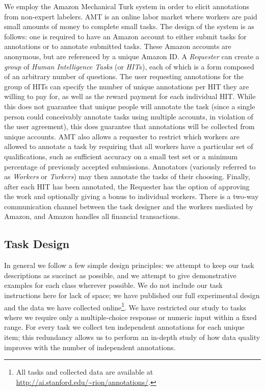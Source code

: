 \documentclass[11pt]{article}
\newcommand{\hurl}[1]{\href{#1}{\scriptsize{\url{#1}}}}
\begin{document}
We employ the Amazon Mechanical Turk system in order to elicit annotations from non-expert labelers.  %
AMT is an online labor market where workers are paid small amounts of money to complete small tasks.  The design of the system is as follows: one is required to have an Amazon account to either submit tasks for annotations or to annotate submitted tasks.  These Amazon accounts are anonymous, but are referenced by a unique Amazon ID.  A \textit{Requester} can create a \textit{group} of \textit{Human Intelligence Tasks} (or \textit{HIT}s), each of which is a form composed of an arbitrary number of questions.  The user requesting annotations for the group of HITs can specify the number of unique annotations per HIT they are willing to pay for, as well as the reward payment for each individual HIT.  While this does not guarantee that unique people will annotate the task (since a single person could conceivably annotate tasks using multiple accounts, in violation of the user agreement), this does guarantee that annotations will be collected from unique accounts.  AMT also allows a requester to restrict which workers are allowed to annotate a task by requiring that all workers have a particular set of qualifications, such as sufficient accuracy on a small test set or a minimum percentage of previously accepted submissions.  Annotators (variously referred to as \textit{Workers} or \textit{Turkers}) may then annotate the tasks of their choosing. Finally, after each HIT has been annotated, the Requester has the option of approving the work and optionally giving a bonus to individual workers. There is a two-way communication channel between the task designer and the workers mediated by Amazon, and Amazon handles all financial transactions.
 
\vspace*{-0.05in}
\subsection{ Task Design }

In general we follow a few simple design principles:  we attempt to keep our task descriptions as succinct as possible, and we attempt to give demonstrative examples for each class wherever possible.  We do not include our task instructions here for lack of space; we have published our full experimental design and the data we have collected online\footnote{All tasks and collected data are available at \hurl{http://ai.stanford.edu/\~rion/annotations/}.}.  We have restricted our study to tasks where we require only a multiple-choice response or numeric input within a fixed range. For every task we collect ten independent annotations for each unique item; this redundancy allows us to perform an in-depth study of how data quality improves with the number of independent annotations.
\end{document}
